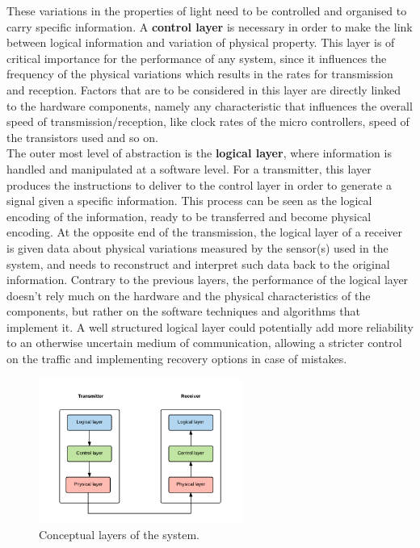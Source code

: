 These variations in the properties of light need to be controlled and organised to carry specific information.
A \textbf{control layer} is necessary in order to make the link between logical information and variation of physical property.
This layer is of critical importance for the performance of any system, since it influences the frequency of the physical variations which results in the rates for transmission and reception.
Factors that are to be considered in this layer are directly linked to the hardware components, namely any characteristic that influences the overall speed of transmission/reception, like clock rates of the micro controllers, speed of the transistors used and so on.\\

The outer most level of abstraction is the \textbf{logical layer}, where information is handled and manipulated at a software level.
For a transmitter, this layer produces the instructions to deliver to the control layer in order to generate a signal given a specific information. 
This process can be seen as the logical encoding of the information, ready to be transferred and become physical encoding.
At the opposite end of the transmission, the logical layer of a receiver is given data about physical variations measured by the sensor(s) used in the system, and needs to reconstruct and interpret such data back to the original information.
Contrary to the previous layers, the performance of the logical layer doesn't rely much on the hardware and the physical characteristics of the components, but rather on the software techniques and algorithms that implement it.
A well structured logical layer could potentially add more reliability to an otherwise uncertain medium of communication, allowing a stricter control on the traffic and implementing recovery options in case of mistakes.

\begin{figure}[hbt]
  \centering
  \includegraphics[height=180px]{img/LCP}
  \caption{Conceptual layers of the system.}
  \label{fig:lcp}
\end{figure}


